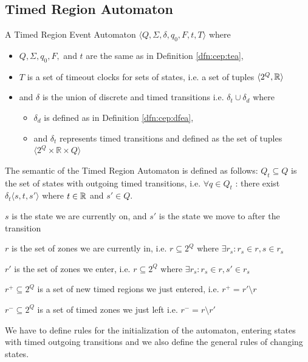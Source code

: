 		\subsection{Timed Region Automaton}
			\begin{dfn}
				\label{dfn:cep:TREA}
				A Timed Region Event Automaton $\langle Q,\Sigma,\delta,q_0, F, t, T \rangle$ where
				\begin{itemize}
					\item $Q, \Sigma, q_0, F,$ and  $t$ are the same as in Definition \ref{dfn:cep:tea},
					\item $T$ is a set of timeout clocks for sets of states, i.e. a set of tuples $\langle 2^Q, \mathbb{R} \rangle$
					\item and $\delta$ is the union of discrete and timed transitions i.e. $\delta_t \cup \delta_d$ where
					\begin{itemize}
						\item $\delta_d$ is defined as in Definition \ref{dfn:cep:dfea},
						\item and $\delta_t$ represents timed transitions and defined as the set of tuples $\langle 2^Q \times \mathbb{R} \times Q \rangle$ 
					\end{itemize}
				\end{itemize}
			\end{dfn}
			
			The semantic of the Timed Region Automaton is defined as follows:
			$Q_t \subseteq Q$ is the set of states with outgoing timed transitions, 
			i.e. $\forall q \in Q_t$ : there exist $ \delta_t\langle s, t, s' \rangle$ where $t \in \mathbb{R}$ and $s' \in Q$.
		
			$s$ is the state we are currently on, and $s'$ is the state we move to after the transition
		
			$r$ is the set of zones we are currently in, 
			i.e. $r \subseteq 2^Q$ where $\exists r_s : r_s \in r, s \in r_s $ 
			
			$r'$ is the set of zones we enter,
			i.e. $r \subseteq 2^Q$ where $\exists r_s :  r_s \in r, s' \in r_s $ 
			
			$r^+ \subseteq 2^Q$ is a set of new timed regions we just entered,
			i.e. $r^+ = r' \setminus r$ 
			
			$r^- \subseteq 2^Q$ is a set of timed zones we just left
			i.e. $r^- = r \setminus r'$
		
			We have to define rules for the initialization of the automaton,
			entering states with timed outgoing transitions 
			and we also define the general rules of changing states. 
			
